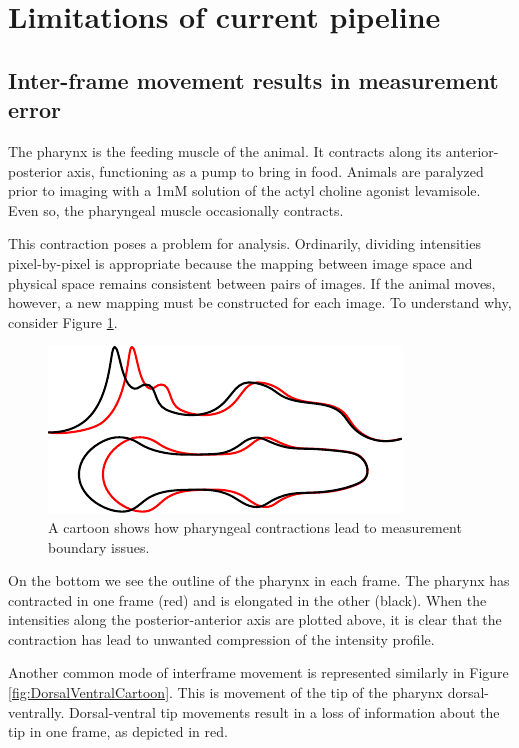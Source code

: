 \section{Limitations of current pipeline} \label{limitations}
\subsection{Inter-frame movement results in measurement error} \label{limitationMovement}

The pharynx is the feeding muscle of the animal. It contracts along its anterior-posterior axis, functioning as a pump to bring in food. Animals are paralyzed prior to imaging with a 1mM solution of the actyl choline agonist levamisole. Even so, the pharyngeal muscle occasionally contracts. 

This contraction poses a problem for analysis. Ordinarily, dividing intensities pixel-by-pixel is appropriate because the mapping between image space and physical space remains consistent between pairs of images. If the animal moves, however, a new mapping must be constructed for each image. To understand  why, consider Figure \ref{fig:ContractionsCartoon}.

\begin{figure}[ht]
    \centering
    \includegraphics{Figures/rendered_files/contraction_cartoon}
    \decoRule
    \caption[Pharyngeal contractions lead to boundary issues]{A cartoon shows how pharyngeal contractions lead to measurement boundary issues.}
    \label{fig:ContractionsCartoon}
\end{figure}

On the bottom we see the outline of the pharynx in each frame. The pharynx has contracted in one frame (red) and is elongated in the other (black). When the intensities along the posterior-anterior axis are plotted above, it is clear that the contraction has lead to unwanted compression of the intensity profile.

Another common mode of interframe movement is represented similarly in Figure \ref{fig:DorsalVentralCartoon}. This is movement of the tip of the pharynx dorsal-ventrally. Dorsal-ventral tip movements result in a loss of information about the tip in one frame, as depicted in red.

